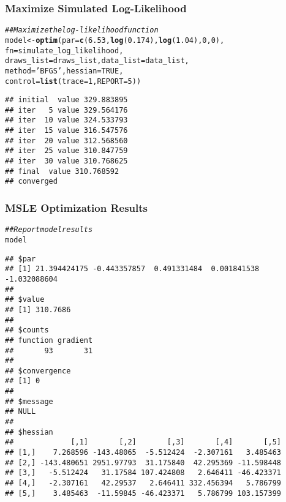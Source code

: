 \documentclass{beamer}\usepackage[]{graphicx}\usepackage[]{color}
\makeatletter
\newcommand{\hlnum}[1]{\textcolor[rgb]{0.686,0.059,0.569}{#1}}%
\newcommand{\hlstr}[1]{\textcolor[rgb]{0.192,0.494,0.8}{#1}}%
\newcommand{\hlcom}[1]{\textcolor[rgb]{0.678,0.584,0.686}{\textit{#1}}}%
\newcommand{\hlstd}[1]{\textcolor[rgb]{0.345,0.345,0.345}{#1}}%
\newcommand{\hlkwb}[1]{\textcolor[rgb]{0.69,0.353,0.396}{#1}}%
\newcommand{\hlkwc}[1]{\textcolor[rgb]{0.333,0.667,0.333}{#1}}%
\newcommand{\hlkwd}[1]{\textcolor[rgb]{0.737,0.353,0.396}{\textbf{#1}}}%
\newenvironment{kframe}{%
 \def\at@end@of@kframe{}%
 \ifinner\ifhmode%
  \def\at@end@of@kframe{\end{minipage}}%
  \begin{minipage}{\columnwidth}%
 \fi\fi%
 \def\FrameCommand##1{\hskip\@totalleftmargin \hskip-\fboxsep
 \colorbox{shadecolor}{##1}\hskip-\fboxsep
     \hskip-\linewidth \hskip-\@totalleftmargin \hskip\columnwidth}%
 \MakeFramed {\advance\hsize-\width
   \@totalleftmargin\z@ \linewidth\hsize
   \@setminipage}}%
 {\par\unskip\endMakeFramed%
 \at@end@of@kframe}
\newenvironment{knitrout}{}{} %
\makeatother
\begin{document}
\begin{frame}[fragile]\frametitle{Maximize Simulated Log-Likelihood}
\begin{knitrout}\footnotesize
{}\color{fgcolor}\begin{kframe}
\begin{alltt}
\hlcom{## Maximize the log-likelihood function}
\hlstd{model} \hlkwb{<-} \hlkwd{optim}\hlstd{(}\hlkwc{par} \hlstd{=} \hlkwd{c}\hlstd{(}\hlnum{6.53}\hlstd{,} \hlkwd{log}\hlstd{(}\hlnum{0.174}\hlstd{),} \hlkwd{log}\hlstd{(}\hlnum{1.04}\hlstd{),} \hlnum{0}\hlstd{,} \hlnum{0}\hlstd{),}
               \hlkwc{fn} \hlstd{= simulate_log_likelihood,}
               \hlkwc{draws_list} \hlstd{= draws_list,} \hlkwc{data_list} \hlstd{= data_list,}
               \hlkwc{method} \hlstd{=} \hlstr{'BFGS'}\hlstd{,} \hlkwc{hessian} \hlstd{=} \hlnum{TRUE}\hlstd{,}
               \hlkwc{control} \hlstd{=} \hlkwd{list}\hlstd{(}\hlkwc{trace} \hlstd{=} \hlnum{1}\hlstd{,} \hlkwc{REPORT} \hlstd{=} \hlnum{5}\hlstd{))}
\end{alltt}
\begin{verbatim}
## initial  value 329.883895 
## iter   5 value 329.564176
## iter  10 value 324.533793
## iter  15 value 316.547576
## iter  20 value 312.568560
## iter  25 value 310.847759
## iter  30 value 310.768625
## final  value 310.768592 
## converged
\end{verbatim}
\end{kframe}
\end{knitrout}
\end{frame}

\begin{frame}[fragile]\frametitle{MSLE Optimization Results}
\begin{knitrout}\scriptsize
{}\color{fgcolor}\begin{kframe}
\begin{alltt}
\hlcom{## Report model results}
\hlstd{model}
\end{alltt}
\begin{verbatim}
## $par
## [1] 21.394424175 -0.443357857  0.491331484  0.001841538 -1.032088604
## 
## $value
## [1] 310.7686
## 
## $counts
## function gradient 
##       93       31 
## 
## $convergence
## [1] 0
## 
## $message
## NULL
## 
## $hessian
##             [,1]       [,2]       [,3]       [,4]       [,5]
## [1,]    7.268596 -143.48065  -5.512424  -2.307161   3.485463
## [2,] -143.480651 2951.97793  31.175840  42.295369 -11.598448
## [3,]   -5.512424   31.17584 107.424808   2.646411 -46.423371
## [4,]   -2.307161   42.29537   2.646411 332.456394   5.786799
## [5,]    3.485463  -11.59845 -46.423371   5.786799 103.157399
\end{verbatim}
\end{kframe}
\end{knitrout}
\end{frame}
\end{document}
